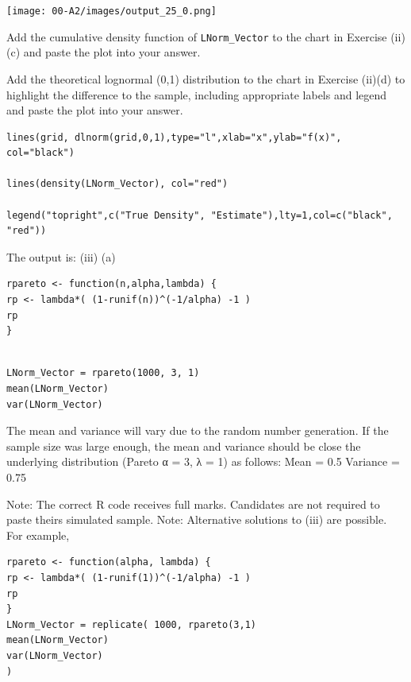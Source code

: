 \documentclass[a4paper,12pt]{article}
\begin{document}
\texttt{[image: 00-A2/images/output\_25\_0.png]}

\newpage 

Add the cumulative density function of \texttt{LNorm\_Vector} to the chart
in Exercise  (ii)(c) and paste the plot into your answer.


Add the theoretical lognormal (0,1) distribution to the chart in Exercise  (ii)(d) to highlight the difference to the sample, including
appropriate labels and legend and paste the plot into your answer.



\begin{framed} \begin{verbatim}
lines(grid, dlnorm(grid,0,1),type="l",xlab="x",ylab="f(x)", col="black")

lines(density(LNorm_Vector), col="red")

legend("topright",c("True Density", "Estimate"),lty=1,col=c("black", "red"))

\end{verbatim}\end{framed}


\newpage 



The output is:
(iii) (a)

\begin{framed} \begin{verbatim}
rpareto <- function(n,alpha,lambda) {
rp <- lambda*( (1-runif(n))^(-1/alpha) -1 )
rp
}
\end{verbatim}\end{framed}


\begin{framed} \begin{verbatim}

LNorm_Vector = rpareto(1000, 3, 1)
mean(LNorm_Vector)
var(LNorm_Vector)
\end{verbatim}\end{framed}



The mean and variance will vary due to the random number generation. If the sample size
was large enough, the mean and variance should be close the underlying distribution
(Pareto α = 3, λ = 1) as follows:
Mean = 0.5
Variance = 0.75

\newpage 
Note: The correct R code receives full marks.
Candidates are not required to paste theirs simulated sample.
Note: Alternative solutions to (iii) are possible. For example,
\begin{framed}
\begin{verbatim}
rpareto <- function(alpha, lambda) {
rp <- lambda*( (1-runif(1))^(-1/alpha) -1 )
rp
}
LNorm_Vector = replicate( 1000, rpareto(3,1)
mean(LNorm_Vector)
var(LNorm_Vector)
)
\end{verbatim}
\end{framed}

\end{document}
